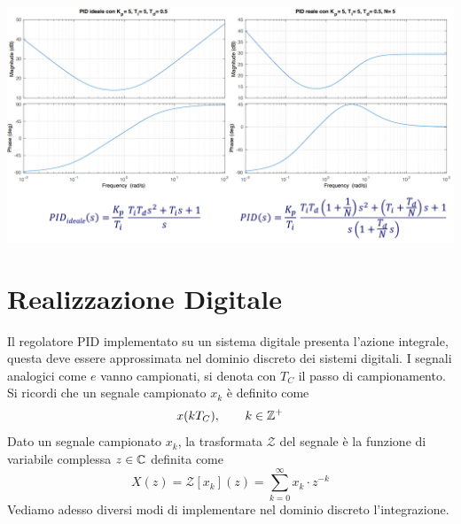 \documentclass[10pt, letterpaper]{report}
\begin{document}
\begin{center}
    \includegraphics[width=1\textwidth]{images/PidRealevsPidIdeale.png}
\end{center}
\flowerLine 
\section{Realizzazione Digitale}
Il regolatore PID implementato su un sistema digitale presenta l'azione integrale, questa deve essere approssimata nel dominio discreto dei sistemi digitali. I segnali analogici come $e$ vanno campionati, si denota con $T_C$ il passo di campionamento. Si ricordi che 
un segnale campionato $x_k$ è definito come $$x(kT_C), \ \ \ \ \ \ k\in\Z^+$$
 Dato un segnale campionato $x_k$, la trasformata $\mathcal Z$ del segnale è la funzione di variabile complessa $z\in {\mathbb C}$ definita come
$$ X(z)=\mathcal Z[x_k](z)=\sum_{k=0}^\infty x_k\cdot z^{-k}
$$
Vediamo adesso diversi modi di implementare nel dominio discreto l'integrazione.  
\end{document}
